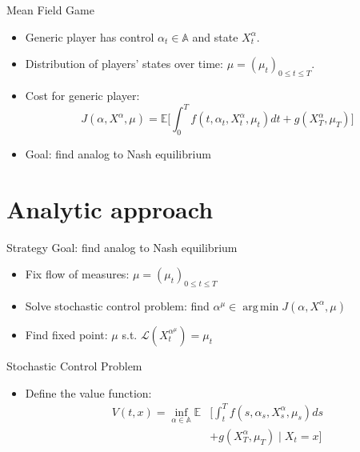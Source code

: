 \documentclass{beamer}
\DeclareMathOperator*{\argmin}{arg\,min}
\begin{document}
	
	\begin{frame}{Mean Field Game}
		\begin{itemize}
			\item {
				Generic player has control $\alpha_t \in \mathbb{A}$ and state $X_t^{\alpha}$.
			}
			\item {
				Distribution of players' states over time: $\mu=(\mu_t)_{0 \leq t \leq T}$.
			}
			\item {
				Cost for generic player:
				\begin{equation}
					J(\alpha,X^{\alpha},\mu)=\mathbb{E}\Bigg[\int_{0}^{T}f(t,\alpha_t,X_t^{\alpha},\mu_t)dt+g(X_T^{\alpha},\mu_T) \Bigg]
				\end{equation}
			}
			\pause
			\item {
				Goal: find analog to Nash equilibrium
			}
		\end{itemize}
	\end{frame}
	
	\section{Analytic approach}
	
	\begin{frame}{Strategy}
		Goal: find analog to Nash equilibrium
		\begin{itemize}
			\item {
				Fix flow of measures: $\mu=(\mu_t)_{0 \leq t \leq T}$
			}
			\item {
				Solve stochastic control problem: find $\alpha^{\mu} \in \argmin J(\alpha,X^{\alpha},\mu)$
			}
			\item {
				Find fixed point: $\mu$ s.t. $\mathcal{L}(X_t^{\alpha^{\mu}})=\mu_t$
			}
		\end{itemize}
	\end{frame}
	
	\begin{frame}{Stochastic Control Problem}
		\begin{itemize}
			\item {
				Define the value function:
				\begin{equation}
					\begin{split}
						V(t,x)=\inf_{\alpha \in \mathbb{A}}\mathbb{E}&\Bigg[\int_{t}^{T}f(s,\alpha_s,X_s^{\alpha},\mu_s)ds \\
						&+g(X_T^{\alpha},\mu_T) \mid X_t = x \Bigg]
					\end{split}
				\end{equation}
			}
		\end{itemize}
	\end{frame}
	
\end{document}
